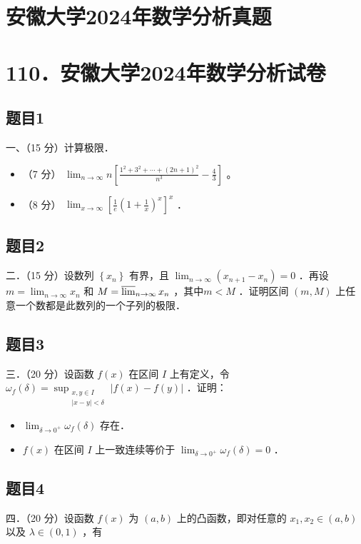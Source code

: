\documentclass{article}
\begin{document}
\section*{安徽大学2024年数学分析真题}
\section*{110．安徽大学2024年数学分析试卷}

\subsection{题目1}
一、（15 分）计算极限．

\begin{itemize}
  \item[（1）] （7 分） \(\lim _{n \rightarrow \infty} n\left[\frac{1^{2}+3^{2}+\cdots+(2 n+1)^{2}}{n^{3}}-\frac{4}{3}\right]\) 。
  \item[（2）] （8 分） \(\lim _{x \rightarrow \infty}\left[\frac{1}{e}\left(1+\frac{1}{x}\right)^{x}\right]^{x}\) ．
\end{itemize}

\subsection{题目2}
二．（15 分）设数列 \(\left\{x_{n}\right\}\) 有界，且 \(\lim _{n \rightarrow \infty}\left(x_{n+1}-x_{n}\right)=0\) ．再设 \(m=\lim _{n \rightarrow \infty} x_{n}\) 和 \(M=\varlimsup_{n \rightarrow \infty} x_{n}\) ，其中\(m<M\) ．证明区间 \((m, M)\) 上任意一个数都是此数列的一个子列的极限．

\subsection{题目3}
三．（20 分）设函数 \(f(x)\) 在区间 \(I\) 上有定义，令 \(\omega_{f}(\delta)=\sup _{\substack{x, y \in I \\|x-y|<\delta}}|f(x)-f(y)|\) ．证明：

\begin{itemize}
  \item[（1）] \(\lim _{\delta \rightarrow 0^{+}} \omega_{f}(\delta)\) 存在．
  \item[（2）] \(f(x)\) 在区间 \(I\) 上一致连续等价于 \(\lim _{\delta \rightarrow 0^{+}} \omega_{f}(\delta)=0\) ．
\end{itemize}

\subsection{题目4}
四．（20 分）设函数 \(f(x)\) 为 \((a, b)\) 上的凸函数，即对任意的 \(x_{1}, x_{2} \in(a, b)\) 以及 \(\lambda \in(0,1)\) ，有
\end{document}

